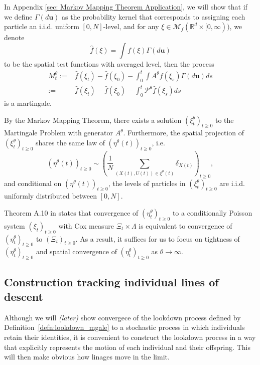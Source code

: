 \documentclass[12pt]{article}
\def \hat{\widehat}
\newcommand{\Pgen}{\mathcal{P}}    %
\newcommand{\lp}{\xi}              %
\newcommand{\comment}[1]{{\color{blue} \it #1}}
\begin{document}
In Appendix \ref{sec: Markov Mapping Theorem Application},
we will show that
if we define $\Gamma (d\textbf{u})$
as the probability kernel that corresponds to
assigning each particle an i.i.d. uniform $[0,N]$-level,
and for any $\lp \in \mathcal{M}_f(\mathbb{R}^d \times [0,\infty))$, we denote
$$\hat{f}(\lp)=\int f(\lp) \Gamma (d\textbf{u})$$ 
to be the spatial test functions with averaged level,
then the process
\begin{equation}
\begin{aligned}
M^{\theta}_t:=&\hat{f}(\lp_t)-\hat{f}(\lp_0)-\int_{0}^{t}\int   A^{\theta}f(\lp_s)\Gamma(d\textbf{u})ds\\
:=&\hat{f}(\lp_t)-\hat{f}(\lp_0)-\int_{0}^{t}   \Pgen^{\theta}\hat{f}(\lp_s)ds
\end{aligned}    
\end{equation}
is a martingale.

By the Markov Mapping Theorem,
there exists a solution $(\xi^{\theta}_t)_{t \geq 0}$
to the Martingale Problem with generator $A^{\theta}$.
Furthermore,
the spatial projection of $(\xi^{\theta}_t)_{t \geq 0}$
shares the same law of $(\eta^{\theta}(t))_{t \geq 0}$,
i.e.
$$(\eta^{\theta}(t))_{t \geq 0}
\sim \left(\frac{1}{N}\sum\limits_{(X(t),U(t))\in \xi^{\theta}(t)} \delta_{X(t)}\right)_{t \geq 0},$$
and conditional on 
$(\eta^{\theta}(t))_{t \geq 0}$,
the levels of particles in $(\xi^{\theta}_t)_{t \geq 0}$
are i.i.d. uniformly distributed between $[0,N]$.

Theorem A.10 in \cite{kurtz/rodrigues:2011}
states that convergence of $(\eta^{\theta}_t)_{t \geq 0}$
to a conditionally Poisson system $(\xi_t)_{t \geq 0}$
with Cox measure $\Xi_t \times \Lambda$
is equivalent to convergence of
$(\eta^{\theta}_t)_{t \geq 0}$ to $(\Xi_t)_{t \geq 0}$.
As a result, it suffices for us to focus on
tightness of $(\eta^{\theta}_t)_{t \geq 0}$
and spatial convergence of $(\eta^{\theta}_t)_{t \geq 0}$
as $\theta \to \infty$.


\subsection{Construction tracking individual lines of descent}

Although we will \comment{(later)} show convergece of the lookdown process
defined by Definition~\ref{defn:lookdown_mgale}
to a stochastic process in which individuals retain their identities,
it is convenient to construct the lookdown process
in a way that explicitly represents the motion of each individual and their offspring.
This will then make obvious how linages move in the limit.
\end{document}
